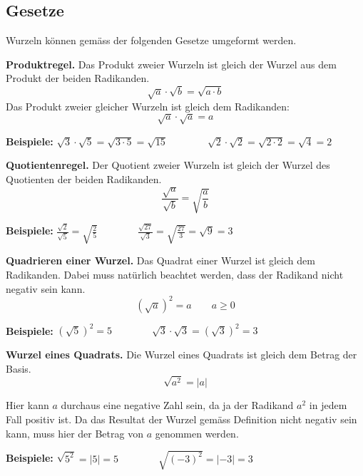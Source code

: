 \subsection{Gesetze}

Wurzeln können gemäss der folgenden Gesetze umgeformt werden.
\begin{theorem}
  \textbf{Produktregel.} Das Produkt zweier Wurzeln ist gleich der Wurzel aus dem Produkt der beiden Radikanden.
  \[
    \sqrt{a}\cdot\sqrt{b} = \sqrt{a\cdot b}
  \]
  Das Produkt zweier gleicher Wurzeln ist gleich dem Radikanden:
  \[
    \sqrt{a}\cdot\sqrt{a} = a
  \]
\end{theorem}
\begin{example}
  \textbf{Beispiele:} $\displaystyle \sqrt{3}\cdot\sqrt{5} = \sqrt{3\cdot 5} = \sqrt{15} \qquad\qquad \sqrt{2}\cdot\sqrt{2} = \sqrt{2\cdot 2} = \sqrt{4} = 2$
\end{example}
\begin{theorem}
  \textbf{Quotientenregel.} Der Quotient zweier Wurzeln ist gleich der Wurzel des Quotienten der beiden Radikanden.
  \[
    \frac{\sqrt{a}}{\sqrt{b}} = \sqrt{\frac{a}{b}}
  \]
\end{theorem}
\begin{example}
  \textbf{Beispiele:} $\displaystyle \frac{\sqrt{2}}{\sqrt{5}} = \sqrt{\frac{2}{5}} \qquad\qquad \frac{\sqrt{27}}{\sqrt{3}} = \sqrt{\frac{27}{3}} = \sqrt{9} = 3$
\end{example}
\begin{theorem}
  \textbf{Quadrieren einer Wurzel.} Das Quadrat einer Wurzel ist gleich dem Radikanden. Dabei muss natürlich beachtet werden, dass der Radikand nicht negativ sein kann.
  \[
    \left(\sqrt{a}\right)^{2} = a \qquad a\ge 0
  \]
\end{theorem}
\begin{example}
  \textbf{Beispiele:} $\displaystyle \left(\sqrt{5}\right)^{2} = 5 \qquad\qquad \sqrt{3}\cdot\sqrt{3} = \left(\sqrt{3}\right)^{2} = 3$
\end{example}
\begin{theorem}
  \textbf{Wurzel eines Quadrats.} Die Wurzel eines Quadrats ist gleich dem Betrag der Basis.
  \[
    \sqrt{a^{2}} = |a|
  \]
\end{theorem}
Hier kann $a$ durchaus eine negative Zahl sein, da ja der Radikand $a^{2}$ in jedem Fall positiv ist. Da das Resultat der Wurzel gemäss Definition nicht negativ sein kann, muss hier der Betrag von $a$ genommen werden.
\begin{example}
  \textbf{Beispiele:} $\displaystyle \sqrt{5^{2}} = |5| = 5 \qquad\qquad \sqrt{(-3)^{2}} = |-3| = 3$
\end{example}
